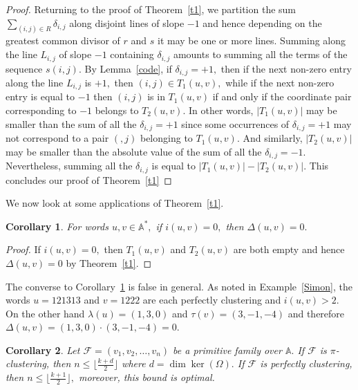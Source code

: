 \documentclass[12pt,a4paper]{amsart}
\newcommand{\A}{{\mathbb A}}
\newtheorem{corollary}{Corollary}
\begin{document}
\begin{proof}
Returning to the proof of Theorem~\ref{t1}, we partition the sum  $\sum_{(i,j)\in R}\delta_{i,j}$ along disjoint lines of slope $-1$ and hence depending on the greatest common divisor of $r$ and $s$ it may be one or more lines. Summing along the line $L_{i,j}$ of slope $-1$ containing $\delta_{i,j}$ amounts to summing all the terms of the sequence $s(i,j).$ By Lemma~\ref{code}, if $\delta_{i,j}=+1,$ then if the next non-zero entry along the line $L_{i,j}$ is $+1,$ then $(i,j)\in T_1(u,v),$ while if the next non-zero entry is equal to $-1$ then $(i,j)$ is in $T_1(u,v)$ if and only if the coordinate pair corresponding to $-1$ belongs to $T_2(u,v).$ In other words, $|T_1(u,v)|$ may be smaller than the sum of all the $\delta_{i,j}=+1$ since some occurrences of $\delta_{i,j}=+1$ may not correspond to a pair $(,j)$ belonging to $T_1(u,v).$ And similarly, $|T_2(u,v)|$ may be smaller than the absolute value of the sum of all the $\delta_{i,j}=-1.$ Nevertheless, summing all the $\delta_{i,j}$ is equal to $|T_1(u,v)|-|T_2(u,v)|.$ This concludes our proof of Theorem~\ref{t1}   \end{proof}


We now look at some applications of Theorem~\ref{t1}. 


\begin{corollary}\label{index0} For words $u,v \in \A^*,$ if $i(u,v)=0,$ then $\Delta(u,v)=0.$
\end{corollary}

\begin{proof} If $i(u,v)=0,$ then $T_1(u,v)$ and $T_2(u,v)$ are both empty and hence $\Delta(u,v)=0$ by Theorem~\ref{t1}. 
\end{proof}

The converse to Corollary~\ref{index0} is false in general. As noted in Example~\ref{Simon}, the  words $u=121313$ and $v=1222$ are each perfectly clustering and  $i(u,v)>2.$ On the other hand $\lambda (u)=(1,3,0)$ and $\tau(v)=(3,-1,-4)$ and therefore $\Delta(u,v)=(1,3,0)\cdot (3,-1,-4)=0.$



\begin{corollary}Let $\mathcal F=(v_1,v_2,\ldots,v_n)$ be a primitive family over $\A.$ If $\mathcal F$ is $\pi$-clustering, then $n\leq \lfloor \frac {k+d}{2} \rfloor$ where $d=\dim \ker (\Omega).$  
If $\mathcal F$ is perfectly clustering, then $n\leq \lfloor \frac {k+1}{2} \rfloor,$ moreover, this  bound is optimal. 
\end{corollary}
\end{document}
